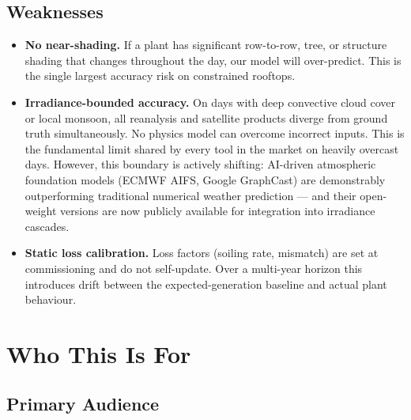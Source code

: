 \documentclass[11pt, a4paper]{article}
\newcommand{\highlight}[1]{\textbf{\color{brandblue}#1}}
\begin{document}
\subsection{Weaknesses}

\begin{itemize}
  \item \highlight{No near-shading.} If a plant has significant row-to-row,
    tree, or structure shading that changes throughout the day, our model will
    over-predict. This is the single largest accuracy risk on constrained
    rooftops.
  \item \highlight{Irradiance-bounded accuracy.} On days with deep convective
    cloud cover or local monsoon, all reanalysis and satellite products
    diverge from ground truth simultaneously. No physics model can overcome
    incorrect inputs. This is the fundamental limit shared by every tool
    in the market on heavily overcast days. However, this boundary is actively
    shifting: AI-driven atmospheric foundation models (ECMWF AIFS, Google
    GraphCast) are demonstrably outperforming traditional numerical weather
    prediction --- and their open-weight versions are now publicly available
    for integration into irradiance cascades.
  \item \highlight{Static loss calibration.} Loss factors (soiling rate,
    mismatch) are set at commissioning and do not self-update. Over a
    multi-year horizon this introduces drift between the expected-generation
    baseline and actual plant behaviour.
\end{itemize}

\section{Who This Is For}

\subsection{Primary Audience}
\end{document}

